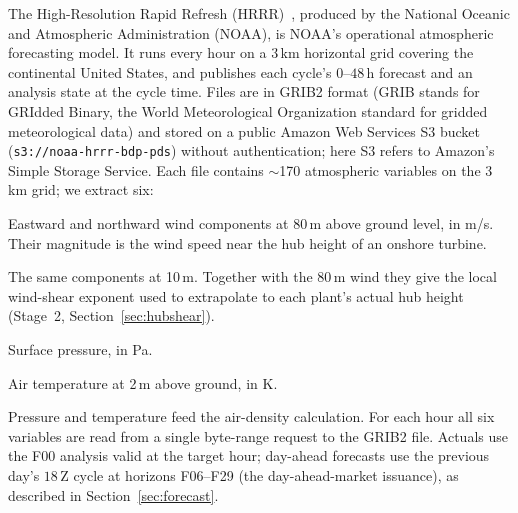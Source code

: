 \documentclass[11pt]{article}
\newcommand{\code}[1]{\texttt{\small #1}}
\begin{document}
The High-Resolution Rapid Refresh (HRRR)~\citep{dowell2022hrrr},
produced by the National Oceanic and Atmospheric Administration (NOAA),
is NOAA's operational atmospheric
forecasting model. It runs every hour on a $3\,$km horizontal grid
covering the continental United States, and publishes each cycle's
$0$--$48\,$h forecast and an analysis state at the cycle time. Files
are in GRIB2 format (GRIB stands for GRIdded Binary, the World
Meteorological Organization standard for gridded meteorological data)
and stored on a public Amazon Web Services S3 bucket
(\code{s3://noaa-hrrr-bdp-pds}) without authentication; here S3 refers
to Amazon's Simple Storage Service. Each file contains
$\sim$170 atmospheric variables on the 3\,km grid; we extract six:
\begin{description}[leftmargin=*]
  \item[\code{UGRD@80m}, \code{VGRD@80m}] Eastward and northward wind
        components at 80\,m above ground level, in m/s. Their magnitude is
        the wind speed near the hub height of an onshore turbine.
  \item[\code{UGRD@10m}, \code{VGRD@10m}] The same components at 10\,m.
        Together with the 80\,m wind they give the local wind-shear
        exponent used to extrapolate to each plant's actual hub height
        (Stage~2, Section~\ref{sec:hubshear}).
  \item[\code{PRES:surface}] Surface pressure, in Pa.
  \item[\code{TMP:2 m above ground}] Air temperature at 2\,m above ground,
        in K.
\end{description}
Pressure and temperature feed the air-density calculation. For each hour
all six variables are read from a single byte-range request to the GRIB2
file. Actuals use the F00 analysis valid at the target hour; day-ahead
forecasts use the previous day's $18$\,Z cycle at horizons F06--F29 (the
day-ahead-market issuance), as described in Section~\ref{sec:forecast}.
\end{document}
